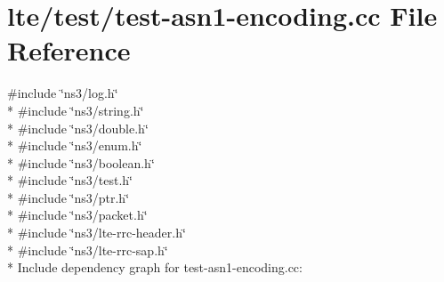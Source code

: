 \hypertarget{test-asn1-encoding_8cc}{}\section{lte/test/test-\/asn1-\/encoding.cc File Reference}
\label{test-asn1-encoding_8cc}
{\ttfamily \#include \char`\"{}ns3/log.\+h\char`\"{}}\\*
{\ttfamily \#include \char`\"{}ns3/string.\+h\char`\"{}}\\*
{\ttfamily \#include \char`\"{}ns3/double.\+h\char`\"{}}\\*
{\ttfamily \#include \char`\"{}ns3/enum.\+h\char`\"{}}\\*
{\ttfamily \#include \char`\"{}ns3/boolean.\+h\char`\"{}}\\*
{\ttfamily \#include \char`\"{}ns3/test.\+h\char`\"{}}\\*
{\ttfamily \#include \char`\"{}ns3/ptr.\+h\char`\"{}}\\*
{\ttfamily \#include \char`\"{}ns3/packet.\+h\char`\"{}}\\*
{\ttfamily \#include \char`\"{}ns3/lte-\/rrc-\/header.\+h\char`\"{}}\\*
{\ttfamily \#include \char`\"{}ns3/lte-\/rrc-\/sap.\+h\char`\"{}}\\*
Include dependency graph for test-\/asn1-\/encoding.cc\+:
